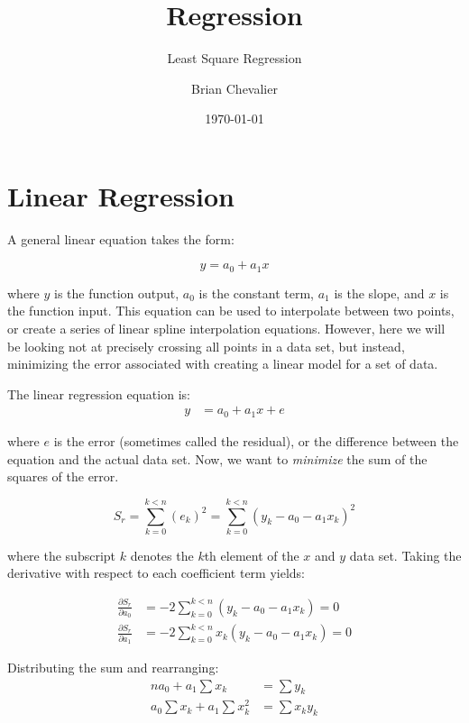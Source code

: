 \documentclass{../../KDHnotes}
\title{Regression}
\subtitle{Least Square Regression}
\author{Brian Chevalier}
\date{\today}
\begin{document}
\maketitle

\section{Linear Regression}

A general linear equation takes the form:

\begin{equation}
	y = a_0 + a_1x
\end{equation}

where $y$ is the function output, $a_0$ is the constant term, $a_1$ is the slope, and $x$ is the function input. This equation can be used to interpolate between two points, or create a series of linear spline interpolation equations. However, here we will be looking not at precisely crossing all points in a data set, but instead, minimizing the error associated with creating a linear model for a set of data.

The linear regression equation is:
\begin{align}
	y &= a_0 + a_1 x + e
\end{align}

where $e$ is the error (sometimes called the residual), or the difference between the equation and the actual data set. Now, we want to \textit{minimize} the sum of the squares of the error.

\begin{equation}
S_r = \sum_{k=0}^{k<n} (e_k)^2 = \sum_{k=0}^{k<n} (y_k - a_0 - a_1 x_k)^2
\end{equation}

where the subscript $k$ denotes the $k$th element of the $x$ and $y$ data set.
Taking the derivative with respect to each coefficient term yields:

\begin{align}
	\frac{\partial S_r}{\partial a_0} &= -2 \sum_{k=0}^{k<n} (y_k - a_0 - a_1x_k) = 0 \\
	\frac{\partial S_r}{\partial a_1} &= -2 \sum_{k=0}^{k<n} x_k(y_k - a_0 - a_1x_k) = 0
\end{align}

Distributing the sum and rearranging:
\begin{align}
	na_0 + a_1 \sum x_k &= \sum y_k\\
	a_0 \sum x_k + a_1 \sum x_k^2 &= \sum x_k y_k
\end{align}
\end{document}
